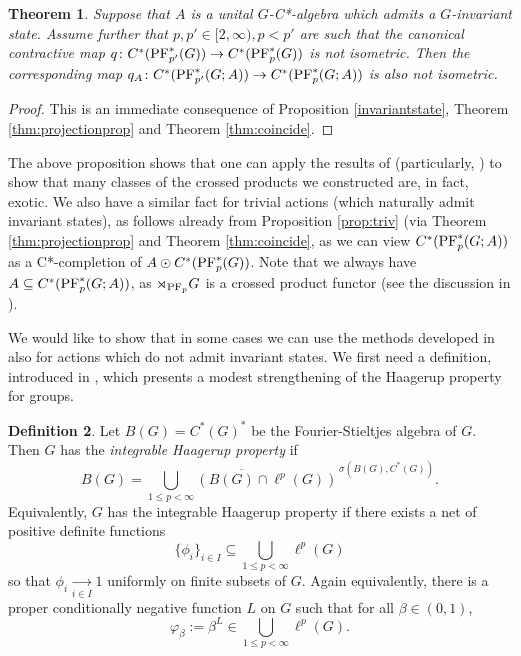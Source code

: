 \documentclass[12pt]{amsart}
\newtheorem{thm}{Theorem}[section]
\theoremstyle{definition}
\newtheorem{defn}[thm]{Definition}
\theoremstyle{remark}
\numberwithin{equation}{section}
\begin{document}
\begin{thm}\label{T:exotic C*-alg imply exotic cross product}
Suppose that $A$ is a unital $G$-C*-algebra which admits a $G$-invariant state. Assume further that $p, p' \in [2,\infty), p <p'$ are such that the canonical contractive map $q\colon C^*(\textup{PF}^*_{p'}(G)) \to C^*(\textup{PF}^*_{p}(G)) $ is not isometric. Then the corresponding map $q_A\colon C^*(\textup{PF}^*_{p'}(G;A)) \to C^*(\textup{PF}^*_{p}(G;A)) $ is also not isometric.
\end{thm}
\begin{proof}
This is an immediate consequence of Proposition \ref{invariantstate}, Theorem \ref{thm:projectionprop} and Theorem \ref{thm:coincide}.
\end{proof}

The above proposition shows that one can apply the results of \cite{SW2} (particularly, \cite[Corollary 4.3 and Corollary 5.12]{SW2}) to show that many classes of the crossed products we constructed are, in fact, exotic. We also have a similar fact for trivial actions (which naturally admit invariant states), as follows already from  Proposition \ref{prop:triv} (via Theorem \ref{thm:projectionprop} and Theorem \ref{thm:coincide}, as we can view  $C^*(\textup{PF}^*_p(G;A))$ as a C*-completion of $A \odot C^*(\textup{PF}^*_p(G))$. Note that we always have $A\subseteq C^*(\textup{PF}^*_p(G;A))$, as $\rtimes_{\textup{PF}_p} G$ is a crossed product functor (see the discussion in \cite[Section 2.1]{BEW}).

We would like to show that in some cases we can use the methods developed in \cite{SW2} also for actions which do not admit invariant states.
We first need a definition, introduced in \cite[Definition 4.1]{SW2}, which presents a modest strengthening of the Haagerup property for groups.

\begin{defn}
Let $B(G)=C^*(G)^*$	be the Fourier-Stieltjes algebra of $G$. %
Then $G$ has the \emph{integrable Haagerup property} if
	$$ B(G)=\overline{\bigcup_{1\leq p<\infty}(B(G)\cap \ell^p(G))}^{\,\sigma(B(G),C^*(G))}.$$
	Equivalently, $G$ has the integrable Haagerup property if there exists a net of positive definite functions%
	$$\{\phi_i\}_{i \in I}\subseteq \bigcup_{1\leq p<\infty}\ell^p(G)$$
	so that $\phi_i\xrightarrow[ i \in I]{} 1$ uniformly on finite subsets of $G$. Again equivalently, there is a proper conditionally negative function $L$ on $G$ such that for all $\beta\in (0,1)$,
$$\varphi_\beta:=\beta^L\in \bigcup_{1\leq p<\infty}\ell^p(G).$$
\end{defn}
\end{document}
